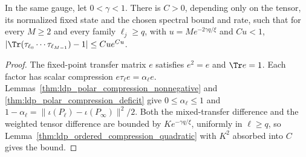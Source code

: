 \begin{lemma}
    \label{thm:ldp_unequal_absolute_trace_second_order}
    \leanok
    In the same gauge, let $0<\gamma<1$. There is $C>0$, depending only
    on the tensor, its normalized fixed state and the chosen spectral
    bound and rate, such that for every $M\ge2$ and every family
    $\ell_j\ge q$, with $u=Me^{-2\gamma q/\xi}$ and $Cu<1$,
    $|\Tr(\tau_{\ell_0}\cdots\tau_{\ell_{M-1}})-1|
        \le Cu e^{Cu}$.
\end{lemma}
\begin{proof}\leanok
    The fixed-point transfer matrix $e$ satisfies $e^2=e$ and
    $\Tr e=1$. Each factor has scalar compression
    $e\tau_\ell e=\alpha_\ell e$.
    Lemmas~\ref{thm:ldp_polar_compression_nonnegative} and
    \ref{thm:ldp_polar_compression_deficit} give
    $0\le\alpha_\ell\le1$ and
    $1-\alpha_\ell=\lVert\iota(P_\ell)-\iota(P_\infty)\rVert^2/2$.
    Both the mixed-transfer difference and the weighted tensor
    difference are bounded by $Ke^{-\gamma q/\xi}$, uniformly in
    $\ell\ge q$, so
    Lemma~\ref{thm:ldp_ordered_compression_quadratic} with
    $K^2$ absorbed into $C$ gives the bound.
\end{proof}
